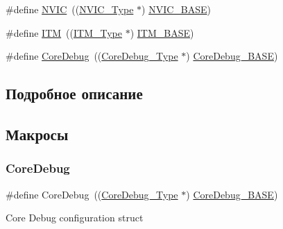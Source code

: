 \begin{DoxyCompactItemize}
\item 
\#define \mbox{\hyperlink{group___c_m_s_i_s___c_m3__core__register_gac8e97e8ce56ae9f57da1363a937f8a17}{N\+V\+IC}}~((\mbox{\hyperlink{struct_n_v_i_c___type}{N\+V\+I\+C\+\_\+\+Type}} $\ast$)          \mbox{\hyperlink{group___c_m_s_i_s___c_m3__core__register_gaa0288691785a5f868238e0468b39523d}{N\+V\+I\+C\+\_\+\+B\+A\+SE}})
\item 
\#define \mbox{\hyperlink{group___c_m_s_i_s___c_m3__core__register_gabae7cdf882def602cb787bb039ff6a43}{I\+TM}}~((\mbox{\hyperlink{struct_i_t_m___type}{I\+T\+M\+\_\+\+Type}} $\ast$)           \mbox{\hyperlink{group___c_m_s_i_s___c_m3__core__register_gadd76251e412a195ec0a8f47227a8359e}{I\+T\+M\+\_\+\+B\+A\+SE}})
\item 
\#define \mbox{\hyperlink{group___c_m_s_i_s___c_m3__core__register_gab6e30a2b802d9021619dbb0be7f5d63d}{Core\+Debug}}~((\mbox{\hyperlink{struct_core_debug___type}{Core\+Debug\+\_\+\+Type}} $\ast$)     \mbox{\hyperlink{group___c_m_s_i_s___c_m3__core__register_ga680604dbcda9e9b31a1639fcffe5230b}{Core\+Debug\+\_\+\+B\+A\+SE}})
\end{DoxyCompactItemize}


\subsection{Подробное описание}


\subsection{Макросы}
\mbox{\label{group___c_m_s_i_s___c_m3__core__register_gab6e30a2b802d9021619dbb0be7f5d63d}} 
\subsubsection{\texorpdfstring{CoreDebug}{CoreDebug}}
{\footnotesize\ttfamily \#define Core\+Debug~((\mbox{\hyperlink{struct_core_debug___type}{Core\+Debug\+\_\+\+Type}} $\ast$)     \mbox{\hyperlink{group___c_m_s_i_s___c_m3__core__register_ga680604dbcda9e9b31a1639fcffe5230b}{Core\+Debug\+\_\+\+B\+A\+SE}})}

Core Debug configuration struct ~\newline
 \mbox{\label{group___c_m_s_i_s___c_m3__core__register_ga680604dbcda9e9b31a1639fcffe5230b}} 
